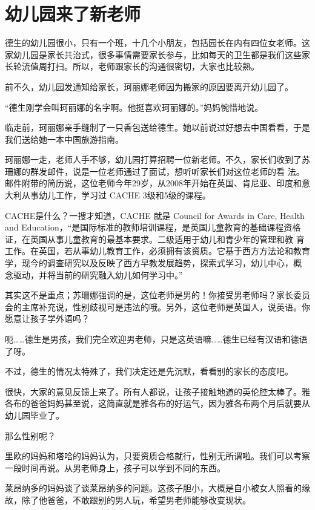 \documentclass[twoside,openright,headings=optiontohead]{ctexbook} %
\begin{document}
{\chapter*{幼儿园来了新老师}\label{male-gartener}

德生的幼儿园很小，只有一个班，十几个小朋友，包括园长在内有四位女老师。这家幼儿园是家长共治式，很多事情需要家长参与，比如每天的卫生都是我们这些家长轮流值周打扫。所以，老师跟家长的沟通很密切，大家也比较熟。

前不久，幼儿园发通知给家长，珂丽娜老师因为搬家的原因要离开幼儿园了。

``德生刚学会叫珂丽娜的名字啊。他挺喜欢珂丽娜的。''妈妈惋惜地说。

临走前，珂丽娜亲手缝制了一只香包送给德生。她以前说过好想去中国看看，于是我们送给她一本中国旅游指南。

珂丽娜一走，老师人手不够，幼儿园打算招聘一位新老师。不久，家长们收到了苏珊娜的群发邮件，说是一位老师通过了面试，想听听家长们对这位老师的看
法。邮件附带的简历说，这位老师今年29岁，从2008年开始在英国、肯尼亚、印度和意大利从事幼儿工作，学习过
CACHE 3级和5级的课程。

CACHE是什么？一搜才知道，CACHE 就是 Council for Awards in Care, Health
and
Education，``是国际标准的教师培训课程，是英国儿童教育的基础课程资格证，在英国从事儿童教育的最基本要求。二级适用于幼儿和青少年的管理和教
育工作。在英国，若从事幼儿教育工作，必须拥有该资质。它基于西方方法论和教育学，现今的调查研究以及反映了西方早教发展趋势，探索式学习，幼儿中心，概
念驱动，并将当前的研究融入幼儿如何学习中。''

其实这不是重点；苏珊娜强调的是，这位老师是男的！你接受男老师吗？家长委员会的主席补充说，性别歧视可是违法的哦。另外，这位老师是英国人，说英语。你愿意让孩子学外语吗？

呃\ldots{}\ldots{}德生是男孩，我们完全欢迎男老师，只是这英语嘛\ldots{}\ldots{}德生已经有汉语和德语了呀。

不过，德生的情况太特殊了，我们决定还是先沉默，看看别的家长的态度吧。

很快，大家的意见反馈上来了。所有人都说，让孩子接触地道的英伦腔太棒了。雅各布的爸爸妈妈甚至说，这简直就是雅各布的好运气，因为雅各布两个月后就要从幼儿园毕业了。

那么性别呢？

里欧的妈妈和塔哈的妈妈认为，只要资质合格就行，性别无所谓啦。我们可以考察一段时间再说。从男老师身上，孩子可以学到不同的东西。

莱昂纳多的妈妈谈了谈莱昂纳多的问题。这孩子胆小，大概是自小被女人照看的缘故，除了他爸爸，不敢跟别的男人玩，希望男老师能够改变现状。

}
\end{document}
